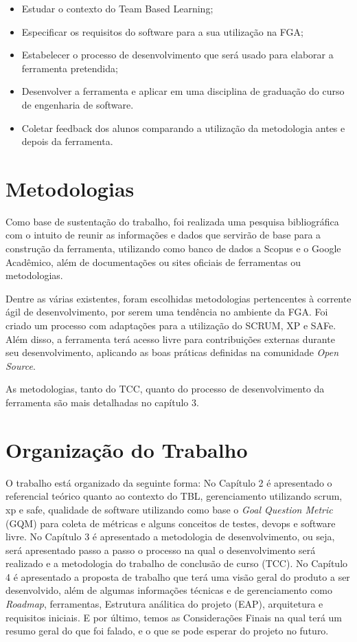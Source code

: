 \begin{itemize}
  \item Estudar o contexto do Team Based Learning;
  \item Especificar os requisitos do software para a sua utilização na FGA;
  \item Estabelecer o processo de desenvolvimento que será usado para elaborar a ferramenta pretendida;
  \item Desenvolver a ferramenta e aplicar em uma disciplina de graduação do curso de engenharia de software.
  \item Coletar feedback dos alunos comparando a utilização da metodologia antes e depois da ferramenta.
\end{itemize}

\section{Metodologias}

Como base de sustentação do trabalho, foi realizada uma pesquisa bibliográfica com o intuito de reunir as informações e dados que servirão de base para a construção da ferramenta, utilizando como banco de dados a Scopus e o Google Acadêmico, além de documentações ou sites oficiais de ferramentas ou metodologias.

Dentre as várias existentes, foram escolhidas metodologias pertencentes à corrente ágil de desenvolvimento, por serem uma tendência no ambiente da FGA. Foi criado um processo com adaptações para a utilização do SCRUM, XP e SAFe. Além disso, a ferramenta terá acesso livre para contribuições externas durante seu desenvolvimento, aplicando as boas práticas definidas na comunidade \textit{Open Source}.

As metodologias, tanto do TCC, quanto do processo de desenvolvimento da ferramenta são mais detalhadas no capítulo 3.

\section{Organização do Trabalho}

O trabalho está organizado da seguinte forma: No Capítulo 2 é apresentado o referencial teórico quanto ao contexto do TBL, gerenciamento utilizando scrum, xp e safe, qualidade de software utilizando como base o \textit{Goal Question Metric} (GQM) para coleta de métricas e alguns conceitos de testes, devops e software livre. No Capítulo 3 é apresentado a metodologia de desenvolvimento, ou seja, será apresentado passo a passo o processo na qual o desenvolvimento será realizado e a metodologia do trabalho de conclusão de curso (TCC). No Capítulo 4 é apresentado a proposta de trabalho que terá uma visão geral do produto a ser desenvolvido, além de algumas informações técnicas e de gerenciamento como \textit{Roadmap}, ferramentas, Estrutura análitica do projeto (EAP), arquitetura e requisitos iniciais. E por último, temos as Considerações Finais na qual terá um resumo geral do que foi falado, e o que se pode esperar do projeto no futuro.

